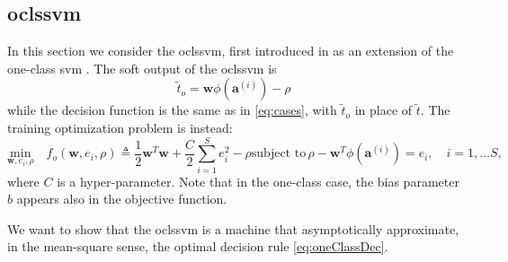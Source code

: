 \documentclass[draftcls,onecolumn,12pt]{IEEEtran}
\begin{document}
\subsection{\Acl{oclssvm}}
In this section we consider the \ac{oclssvm}, first introduced in \cite{choi2009least} as an extension of the one-class \ac{svm} \cite{Scholkopf2001estimating}. The soft output of the \ac{oclssvm} is 
\begin{equation}
	\tilde{t}_o = \mathbf{w} \phi(\mathbf{a}^(i)) - \rho		
\end{equation} 
while the decision function is the same as in \eqref{eq:cases}, with $\tilde{t}_o$ in place of $\tilde{t}$. The training optimization problem is instead:
\begin{subequations}
	\label{eq:oneClassSvm}
	\begin{equation}
	\label{eq:oneClass1}
	\underset{\mathbf{w},e_i, \rho}{\text{min}} \quad f_o(\mathbf{w},e_i, \rho) \triangleq
	 \frac{1}{2} \mathbf{w}^T \mathbf{w} +  \frac{C}{2} \sum_{i=1}^S e_i^2 - \rho 
	\end{equation}
	\begin{equation}
	\label{eq:oneClassConstr}
	\text{subject to}\, \rho - \mathbf{w}^T \phi (\mathbf{a}^{(i)})  = e_i,  \quad i = 1,\dots S, 
	\end{equation}
\end{subequations}
where $C$ is a hyper-parameter.
Note that in the one-class case, the bias parameter $b$ appears also in the objective function.

We want to show that the \ac{oclssvm} is a machine that asymptotically approximate, in the mean-square sense, the optimal decision rule \eqref{eq:oneClassDec}.
\end{document}
